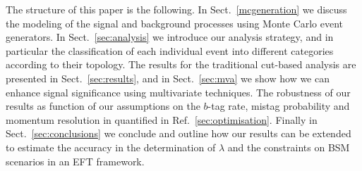 The structure of this paper is the following.
%
In Sect.~\ref{mcgeneration} we discuss the modeling of the signal
and background processes using Monte Carlo event generators.
%
In Sect.~\ref{sec:analysis}
we introduce our analysis strategy, and in particular
the classification of each individual event into
different categories according to their topology.
%
The results for the traditional cut-based analysis
are presented in Sect.~\ref{sec:results}, and in
Sect.~\ref{sec:mva} we show how we can enhance signal
significance using multivariate techniques.
%
The robustness of our results as function of our assumptions
on the $b$-tag rate, mistag probability and momentum
resolution in quantified in Ref.~\ref{sec:optimisation}.
%
Finally in Sect.~\ref{sec:conclusions} we conclude and outline
how our results can be extended to estimate the accuracy
in the determination of $\lambda$ and the constraints on
BSM scenarios in an EFT framework.
